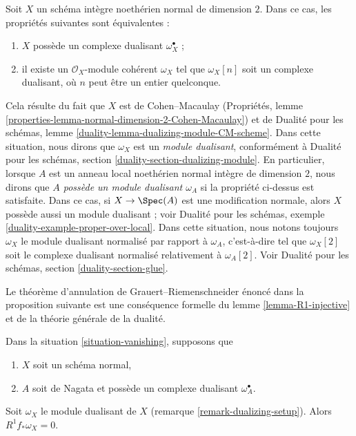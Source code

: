 \begin{remark} \label{remark-dualizing-setup} Soit $X$ un schéma intègre noethérien normal de dimension $2$. Dans ce cas, les propriétés suivantes sont équivalentes : \begin{enumerate} \item $X$ possède un complexe dualisant $\omega_X^\bullet$ ; \item il existe un $\mathcal{O}_X$-module cohérent $\omega_X$ tel que $\omega_X[n]$ soit un complexe dualisant, où $n$ peut être un entier quelconque. \end{enumerate} Cela résulte du fait que $X$ est de Cohen--Macaulay (Propriétés, lemme \ref{properties-lemma-normal-dimension-2-Cohen-Macaulay}) et de Dualité pour les schémas, lemme \ref{duality-lemma-dualizing-module-CM-scheme}. Dans cette situation, nous dirons que $\omega_X$ est un {\it module dualisant}, conformément à Dualité pour les schémas, section \ref{duality-section-dualizing-module}. En particulier, lorsque $A$ est un anneau local noethérien normal intègre de dimension $2$, nous dirons que {\it $A$ possède un module dualisant $\omega_A$} si la propriété ci-dessus est satisfaite. Dans ce cas, si $X \to \Spec(A)$ est une modification normale, alors $X$ possède aussi un module dualisant ; voir Dualité pour les schémas, exemple \ref{duality-example-proper-over-local}. Dans cette situation, nous notons toujours $\omega_X$ le module dualisant normalisé par rapport à $\omega_A$, c'est-à-dire tel que $\omega_X[2]$ soit le complexe dualisant normalisé relativement à $\omega_A[2]$. Voir Dualité pour les schémas, section \ref{duality-section-glue}. \end{remark}

\noindent Le théorème d'annulation de Grauert--Riemenschneider énoncé dans la proposition suivante est une conséquence formelle du lemme \ref{lemma-R1-injective} et de la théorie générale de la dualité.

\begin{proposition} \label{proposition-Grauert-Riemenschneider} Dans la situation \ref{situation-vanishing}, supposons que \begin{enumerate} \item $X$ soit un schéma normal, \item $A$ soit de Nagata et possède un complexe dualisant $\omega_A^\bullet$. \end{enumerate} Soit $\omega_X$ le module dualisant de $X$ (remarque \ref{remark-dualizing-setup}). Alors $R^1f_*\omega_X = 0$. \end{proposition}


